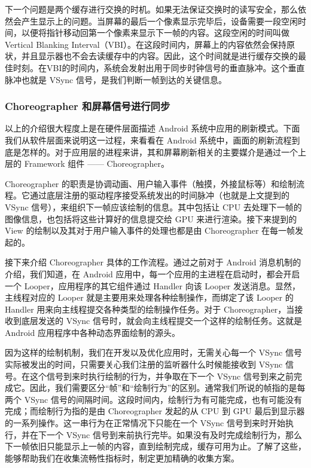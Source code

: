 下一个问题是两个缓存进行交换的时机。如果无法保证交换时的读写安全，那么依然会产生显示上的问题。当屏幕的最后一个像素显示完毕后，设备需要一段空闲时间，以便将指针移动回第一个像素来显示下一帧的内容。这段空闲的时间叫做 Vertical Blanking Interval（VBI）\cite{anderson1971vertical}。在这段时间内，屏幕上的内容依然会保持原状，并且显示器也不会去读缓存中的内容。因此，这个时间就是进行缓存交换的最佳时刻。在VBI的时间内，系统会发射出用于同步时钟信号的垂直脉冲。这个垂直脉冲也就是 VSync 信号，是我们判断一帧到达的关键信息。

\subsubsection*{Choreographer 和屏幕信号进行同步}

以上的介绍很大程度上是在硬件层面描述 Android 系统中应用的刷新模式。下面我们从软件层面来说明这一过程，来看看在 Android 系统中，画面的刷新流程到底是怎样的。对于应用层的进程来讲，其和屏幕刷新相关的主要媒介是通过一个上层的 Framework 组件 —— Choreographer。

Choreographer 的职责是协调动画、用户输入事件（触摸，外接鼠标等）和绘制流程。它通过底层注册的驱动程序接受系统发出的时间脉冲（也就是上文提到的 VSync 信号），来组织下一帧应该绘制的信息。其中包括让 CPU 去处理下一帧的图像信息，也包括将这些计算好的信息提交给 GPU 来进行渲染。接下来提到的 View 的绘制以及其对于用户输入事件的处理也都是由 Choreographer 在每一帧发起的。

接下来介绍 Choreographer 具体的工作流程。通过之前对于 Android 消息机制的介绍，我们知道，在 Android 应用中，每一个应用的主进程在启动时，都会开启一个 Looper，应用程序的其它组件通过 Handler 向该 Looper 发送消息。显然，主线程对应的 Looper 就是主要用来处理各种绘制操作，而绑定了该 Looper 的 Handler 用来向主线程提交各种类型的绘制操作任务。对于 Choreographer，当接收到底层发送的 VSync 信号时，就会向主线程提交一个这样的绘制任务。这就是 Android 应用程序中各种动态界面绘制的源头。


因为这样的绘制机制，我们在开发以及优化应用时，无需关心每一个 VSync 信号实际被发出的时间，只需要关心我们注册的监听器什么时候能接收到 VSync 信号。在这个信号到来时执行绘制的行为，并争取在下一个 VSync 信号到来之前完成它。因此，我们需要区分“帧”和“绘制行为”的区别。通常我们所说的帧指的是每两个 VSync 信号的间隔时间。这段时间内，绘制行为有可能完成，也有可能没有完成；而绘制行为指的是由 Choreographer 发起的从 CPU 到 GPU 最后到显示器的一系列操作。这一串行为在正常情况下只能在一个 VSync 信号到来时开始执行，并在下一个 VSync 信号到来前执行完毕。如果没有及时完成绘制行为，那么下一帧依旧只能显示上一帧的内容，直到绘制完成，缓存可用为止。了解了这些，能够帮助我们在收集流畅性指标时，制定更加精确的收集方案。

